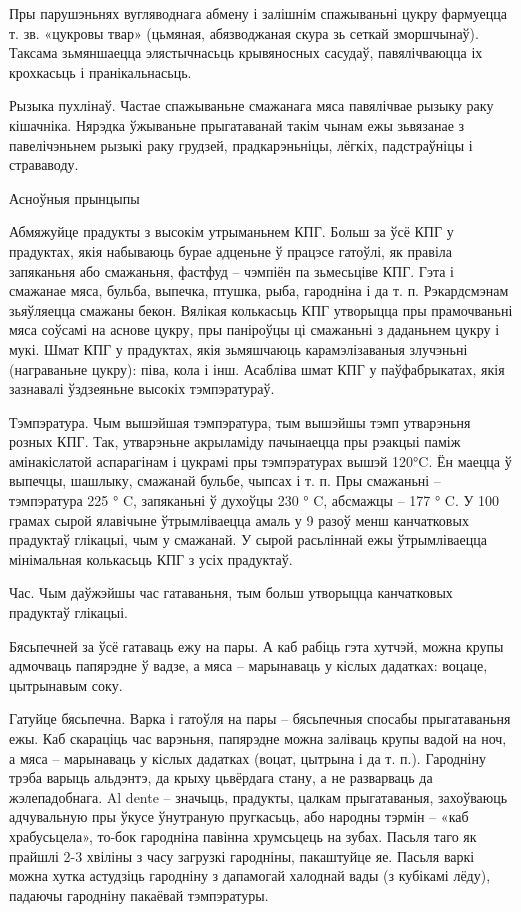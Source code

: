 Пры парушэньнях вугляводнага абмену і залішнім спажываньні цукру фармуецца т. зв. «цукровы твар» (цьмяная, абязводжаная скура зь сеткай зморшчынаў). Таксама зьмяншаецца элястычнасьць крывяносных сасудаў, павялічваюцца іх крохкасьць і пранікальнасьць.

Рызыка пухлінаў.
Частае спажываньне смажанага мяса павялічвае рызыку раку кішачніка. Нярэдка ўжываньне прыгатаванай такім чынам ежы зьвязанае з павелічэньнем рызыкі раку грудзей, прадкарэньніцы, лёгкіх, падстраўніцы і страваводу.

Асноўныя прынцыпы

Абмяжуйце прадукты з высокім утрыманьнем КПГ.
Больш за ўсё КПГ у прадуктах, якія набываюць бурае адценьне ў працэсе гатоўлі, як правіла запяканьня або смажаньня, фастфуд – чэмпіён па зьмесьціве КПГ. Гэта і смажанае мяса, бульба, выпечка, птушка, рыба, гародніна і да т. п. Рэкардсмэнам зьяўляецца смажаны бекон. Вялікая колькасьць КПГ утворыцца пры прамочваньні мяса соўсамі на аснове цукру, пры паніроўцы ці смажаньні з даданьнем цукру і мукі. Шмат КПГ у прадуктах, якія зьмяшчаюць карамэлізаваныя злучэньні (награваньне цукру): піва, кола і інш. Асабліва шмат КПГ у паўфабрыкатах, якія зазнавалі ўздзеяньне высокіх тэмпэратураў.

Тэмпэратура.
Чым вышэйшая тэмпэратура, тым вышэйшы тэмп утварэньня розных КПГ. Так, утварэньне акрыламіду пачынаецца пры рэакцыі паміж амінакіслатой аспарагінам і цукрамі пры тэмпэратурах вышэй 120°C. Ён маецца ў выпечцы, шашлыку, смажанай бульбе, чыпсах і т. п. Пры смажаньні – тэмпэратура 225 ° C, запяканьні ў духоўцы 230 ° C, абсмажцы – 177 ° C. У 100 грамах сырой ялавічыне ўтрымліваецца амаль у 9 разоў менш канчатковых прадуктаў глікацыі, чым у смажанай. У сырой расьліннай ежы ўтрымліваецца мінімальная колькасьць КПГ з усіх прадуктаў.

Час.
Чым даўжэйшы час гатаваньня, тым больш утворыцца канчатковых прадуктаў глікацыі.

Бясьпечней за ўсё гатаваць ежу на пары. А каб рабіць гэта хутчэй, можна крупы адмочваць папярэдне ў вадзе, а мяса – марынаваць у кіслых дадатках: воцаце, цытрынавым соку.

Гатуйце бясьпечна.
Варка і гатоўля на пары – бясьпечныя спосабы прыгатаваньня ежы. Каб скараціць час варэньня, папярэдне можна заліваць крупы вадой на ноч, а мяса – марынаваць у кіслых дадатках (воцат, цытрына і да т. п.). Гародніну трэба варыць альдэнтэ, да крыху цьвёрдага стану, а не разварваць да жэлепадобнага. Al dente – значыць, прадукты, цалкам прыгатаваныя, захоўваюць адчувальную пры ўкусе ўнутраную пругкасьць, або народны тэрмін – «каб храбусьцела», то-бок гародніна павінна хрумсьцець на зубах. Пасьля таго як прайшлі 2-3 хвіліны з часу загрузкі гародніны, пакаштуйце яе. Пасьля варкі можна хутка астудзіць гародніну з дапамогай халоднай вады (з кубікамі лёду), падаючы гародніну пакаёвай тэмпэратуры.


